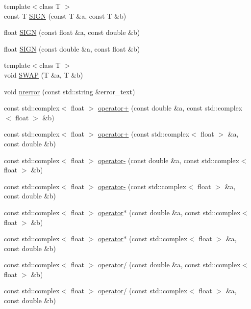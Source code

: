 \begin{DoxyCompactItemize}
\item 
{\footnotesize template$<$class T $>$ }\\const T \mbox{\hyperlink{namespaceNR_a7d16d361ddfe7454271c3a0a8050ece2}{S\+I\+GN}} (const T \&a, const T \&b)
\item 
float \mbox{\hyperlink{namespaceNR_a5269afc715518376429b015036ff955c}{S\+I\+GN}} (const float \&a, const double \&b)
\item 
float \mbox{\hyperlink{namespaceNR_a440c19c5d53c74535be8d59bc5b52a9f}{S\+I\+GN}} (const double \&a, const float \&b)
\item 
{\footnotesize template$<$class T $>$ }\\void \mbox{\hyperlink{namespaceNR_af3d3d41b75c1e0ce80f32a6c45576db3}{S\+W\+AP}} (T \&a, T \&b)
\item 
void \mbox{\hyperlink{namespaceNR_a61ef7c1cda6052203b5b115ef38e51da}{nrerror}} (const std\+::string \&error\+\_\+text)
\item 
const std\+::complex$<$ float $>$ \mbox{\hyperlink{namespaceNR_ad2f255483b92a41caf84daa8e4fb4f2d}{operator+}} (const double \&a, const std\+::complex$<$ float $>$ \&b)
\item 
const std\+::complex$<$ float $>$ \mbox{\hyperlink{namespaceNR_a248dbe3651d0e72fea48fde8c29d03c1}{operator+}} (const std\+::complex$<$ float $>$ \&a, const double \&b)
\item 
const std\+::complex$<$ float $>$ \mbox{\hyperlink{namespaceNR_ad075d6845549afa367e8eabac06de42c}{operator-\/}} (const double \&a, const std\+::complex$<$ float $>$ \&b)
\item 
const std\+::complex$<$ float $>$ \mbox{\hyperlink{namespaceNR_a24cad7076ed686ce43abaceed12e4a91}{operator-\/}} (const std\+::complex$<$ float $>$ \&a, const double \&b)
\item 
const std\+::complex$<$ float $>$ \mbox{\hyperlink{namespaceNR_abe1bfc853e642c91a1084cd7cc55da26}{operator$\ast$}} (const double \&a, const std\+::complex$<$ float $>$ \&b)
\item 
const std\+::complex$<$ float $>$ \mbox{\hyperlink{namespaceNR_a39e0a171e9227121881368e4c636fd97}{operator$\ast$}} (const std\+::complex$<$ float $>$ \&a, const double \&b)
\item 
const std\+::complex$<$ float $>$ \mbox{\hyperlink{namespaceNR_a3b52a0a9d6e4087547b3be89ce0c646b}{operator/}} (const double \&a, const std\+::complex$<$ float $>$ \&b)
\item 
const std\+::complex$<$ float $>$ \mbox{\hyperlink{namespaceNR_a56ac51a96939b7cb972bb84871a7dce4}{operator/}} (const std\+::complex$<$ float $>$ \&a, const double \&b)

\end{DoxyCompactItemize}
